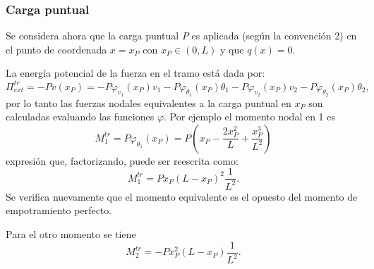 \subsubsection{Carga puntual}

Se considera ahora que la carga puntual $P$ es aplicada (según la convención 2) en el punto de coordenada $x= x_P$ con $x_P \in (0,L)$ y que $q(x)=0$.

La energía potencial de la fuerza en el tramo está dada por:
%
\begin{equation}
\Pi_{ext}^{tr} = - P v (x_P) =  -P \varphi_{v_1}(x_P) v_1 - P \varphi_{\theta_1}(x_P) \theta_1
- P \varphi_{v_2}(x_P) v_2 - P \varphi_{\theta_2}(x_P) \theta_2,
\end{equation}
%
por lo tanto las fuerzas nodales equivalentes a la carga puntual en $x_P$ son calculadas evaluando las funciones $\varphi$. %
%
Por ejemplo el momento nodal en 1 es
%
\begin{equation}
M_1^{tr} = P \varphi_{\theta_1} (x_P) = P  \left(x_P - \frac{2 x_P^{2}}{L} + \frac{x_P^{3}}{L^{2}}\right)
\end{equation}
%
expresión que, factorizando, puede ser reescrita como:
\begin{equation}
M_1^{tr} = P x_P (L-x_P)^2 \frac{1}{L^2}.
\end{equation}
Se verifica nuevamente que el momento equivalente es el opuesto del momento de empotramiento perfecto.

Para el otro momento se tiene
\begin{equation}
M_2^{tr} = -P x_P^2 (L-x_P) \frac{1}{L^2}.
\end{equation}

%
%

